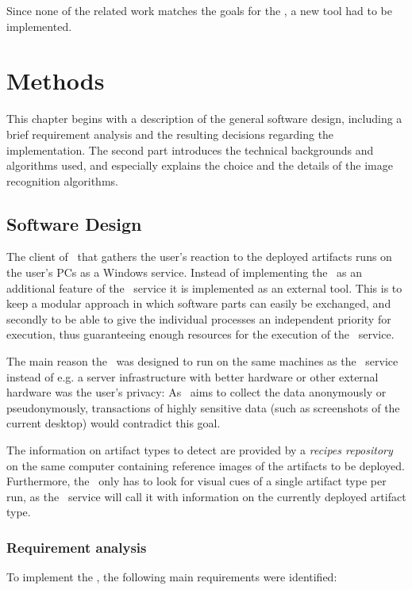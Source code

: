 Since none of the related work matches the goals for the \vad, a new tool had to be implemented.

\chapter{Methods}\label{ch:methods}

This chapter begins with a description of the general software design, including a brief requirement analysis and the resulting decisions regarding the implementation. The second part introduces the technical backgrounds and algorithms used, and especially explains the choice and the details of the image recognition algorithms.

\section{Software Design}\label{sec:software-design}

The client of \ape~that gathers the user's reaction to the deployed artifacts runs on the user's PCs as a Windows service. Instead of implementing the \vad~as an additional feature of the \ape~service it is implemented as an external tool. This is to keep a modular approach in which software parts can easily be exchanged, and secondly to be able to give the individual processes an independent priority for execution, thus guaranteeing enough resources for the execution of the \ape~service.

The main reason the \vd~was designed to run on the same machines as the \ape~service instead of e.g. a server infrastructure with better hardware or other external hardware was the user's privacy:  As \ape~aims to collect the data anonymously or pseudonymously, transactions of highly sensitive data (such as screenshots of the current desktop) would contradict this goal.

The information on artifact types to detect are provided by a \emph{recipes repository} on the same computer containing reference images of the artifacts to be deployed. Furthermore, the \vd~only has to look for visual cues of a single artifact type per run, as the \ape~service will call it with information on the currently deployed artifact type.

\subsection{Requirement analysis}

To implement the \vd, the following main requirements were identified:

